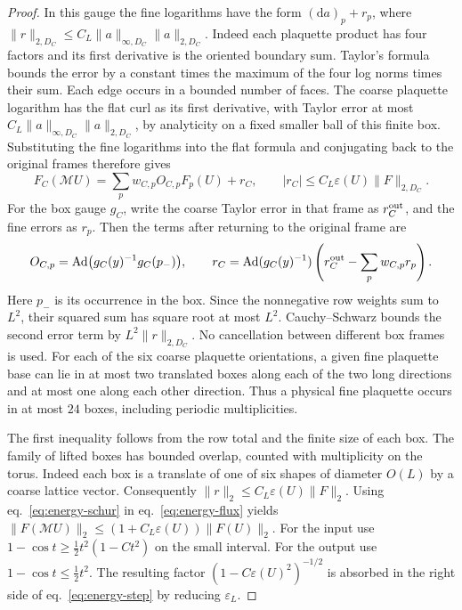 \documentclass[11pt,letterpaper,reqno]{amsart}
\numberwithin{equation}{section}
\renewcommand{\eqref}[1]{\textup{eq.~\ref{#1}}}
\theoremstyle{definition}
\theoremstyle{remark}
\begin{document}
\begin{proof}
In this gauge the fine logarithms have the form
\((\mathrm da)_p+r_p\), where
\(\|r\|_{2,D_C}\le C_L\|a\|_{\infty,D_C}\|a\|_{2,D_C}\).
Indeed each plaquette product has four factors and its first
derivative is the oriented boundary sum. Taylor's formula bounds
the error by a constant times the maximum of the four log norms
times their sum. Each edge occurs in a bounded number of faces.
The coarse plaquette logarithm has the flat curl as its first
derivative, with Taylor error at most
\(C_L\|a\|_{\infty,D_C}\|a\|_{2,D_C}\), by analyticity on a
fixed smaller ball of this finite box. Substituting the fine
logarithms into the flat formula and conjugating back to the
original frames therefore gives
\begin{equation}\label{eq:energy-flux}
 F_C(\mathcal M U)=\sum_p w_{C,p}O_{C,p}F_p(U)+r_C,\qquad
 |r_C|\le C_L\varepsilon(U)\|F\|_{2,D_C}.
\end{equation}
For the box gauge \(g_C\), write the coarse Taylor error in
that frame as \(r_C^{\rm out}\), and the fine errors as \(r_p\).
Then the terms after returning to the original frame are
\[
 O_{C,p}=\operatorname{Ad}\bigl(g_C(y)^{-1}g_C(p_-)\bigr),
 \qquad
 r_C=\operatorname{Ad}(g_C(y)^{-1})
       \left(r_C^{\rm out}-\sum_pw_{C,p}r_p\right).
\]
Here \(p_-\) is its occurrence in the box. Since the
nonnegative row weights sum to \(L^2\), their squared sum
has square root at most \(L^2\). Cauchy--Schwarz bounds the
second error term by \(L^2\|r\|_{2,D_C}\). No cancellation
between different box frames is used. For each of the six
coarse plaquette orientations, a given fine plaquette base
can lie in at most two translated boxes along each of the two
long directions and at most one along each other direction.
Thus a physical fine plaquette occurs in at most \(24\) boxes,
including periodic multiplicities.

The first inequality follows from the row total and the finite
size of each box. The family of lifted boxes has bounded overlap,
counted with multiplicity on the torus. Indeed each box is a
translate of one of six shapes of diameter \(O(L)\) by a coarse
lattice vector. Consequently \(\|r\|_2\le C_L\varepsilon(U)\|F\|_2\).
Using \eqref{eq:energy-schur} in \eqref{eq:energy-flux} yields
\(\|F(\mathcal M U)\|_2\le (1+C_L\varepsilon(U))\|F(U)\|_2\).
For the input use
\(1-\cos t\ge \tfrac12t^2(1-Ct^2)\) on the small interval.
For the output use \(1-\cos t\le \tfrac12t^2\). The resulting
factor \((1-C\varepsilon(U)^2)^{-1/2}\) is absorbed in the
right side of \eqref{eq:energy-step} by reducing \(\varepsilon_L\).
\end{proof}
\end{document}
